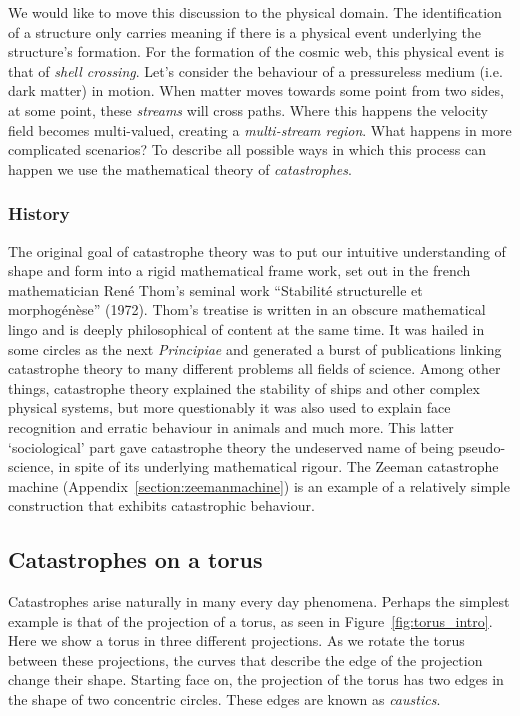 We would like to move this discussion to the physical domain. The identification of a structure only carries meaning if there is a physical event underlying the structure's formation. For the formation of the cosmic web, this physical event is that of \emph{shell crossing}. Let's consider the behaviour of a pressureless medium (i.e. dark matter) in motion. When matter moves towards some point from two sides, at some point, these \emph{streams} will cross paths. Where this happens the velocity field becomes multi-valued, creating a \emph{multi-stream region}. What happens in more complicated scenarios? To describe all possible ways in which this process can happen we use the mathematical theory of \emph{catastrophes}.

\subsubsection{History}
The original goal of catastrophe theory was to put our intuitive understanding of shape and form into a rigid mathematical frame work, set out in the french mathematician Ren\'e Thom's seminal work ``Stabilit\'e structurelle et morphog\'en\`ese'' (1972). Thom's treatise is written in an obscure mathematical lingo and is deeply philosophical of content at the same time. It was hailed in some circles as the next \emph{Principiae} and generated a burst of publications linking catastrophe theory to many different problems all fields of science. Among other things, catastrophe theory explained the stability of ships and other complex physical systems, but more questionably it was also used to explain face recognition and erratic behaviour in animals and much more. This latter `sociological' part gave catastrophe theory the undeserved name of being pseudo-science, in spite of its underlying mathematical rigour.
The Zeeman catastrophe machine (Appendix~\ref{section:zeemanmachine}) is an example of a relatively simple construction that exhibits catastrophic behaviour.

\subsection{Catastrophes on a torus}
Catastrophes arise naturally in many every day phenomena. Perhaps the simplest example is that of the projection of a torus, as seen in Figure~\ref{fig:torus_intro}. Here we show a torus in three different projections. As we rotate the torus between these projections, the curves that describe the edge of the projection change their shape. Starting face on, the projection of the torus has two edges in the shape of two concentric circles. These edges are known as \emph{caustics}.

